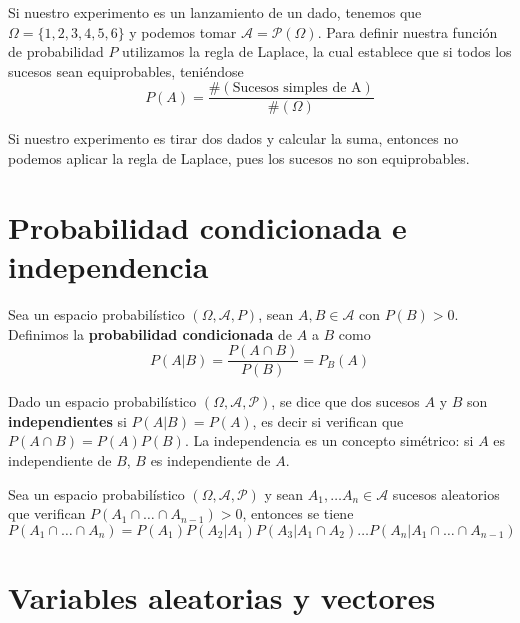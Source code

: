 \documentclass[PREyA.tex]{subfiles}
\begin{document}
\begin{example} Si nuestro experimento es un lanzamiento de un dado, tenemos que $\Omega = \{1,2,3,4,5,6\}$ y podemos tomar $\mathscr{A} =  \mathcal{P} (\Omega)$. Para definir nuestra función de probabilidad $P$ utilizamos la regla de Laplace, la cual establece que si todos los sucesos sean equiprobables, teniéndose
$$
P(A) = \frac{\#(\text{Sucesos simples de A})}{\#(\Omega)}$$
\end{example} 
\begin{example} Si nuestro experimento es tirar dos dados y calcular la suma, entonces no podemos aplicar la regla de Laplace, pues los sucesos no son equiprobables.
\end{example} 

\section{Probabilidad condicionada e independencia}
\begin{defi}
Sea un espacio probabil\'istico $(\Omega,\mathscr{A}, P )$, sean $A,B\in \mathscr{A}$ con $P(B)>0$. Definimos la \textbf{probabilidad condicionada} de $A$ a $B$ como
\begin{equation*}
P(A|B)=\frac{P(A\cap B)}{P(B)}=P_{B}(A)
\end{equation*}
\end{defi}

\begin{defi}
Dado un espacio  probabil\'istico $(\Omega,\mathscr{A},\mathcal{P})$, se dice que dos sucesos $A$ y $B$ son \textbf{independientes} si $P(A|B) = P(A)$, es decir si verifican que $P(A\cap B)=P(A)P(B)$. La independencia es un concepto sim\'etrico: si $A$ es independiente de $B$, $B$ es independiente de $A$.
\end{defi}

\begin{prop}
Sea un espacio probabil\'istico $(\Omega,\mathscr{A},\mathcal{P})$ y sean $A_1, \dotsc A_n \in \mathscr{A}$ sucesos aleatorios que verifican $P(A_1 \cap \dotsc \cap A_{n-1}) > 0$, entonces se tiene
\begin{equation*}
P(A_1 \cap \dotsc \cap A_n) = P(A_1)P(A_2 | A_1)P(A_3|A_1 \cap A_2)\dotsc P(A_n | A_1 \cap \dotsc \cap A_{n-1})
\end{equation*}
\end{prop}

\section{Variables aleatorias y vectores}
\end{document}
